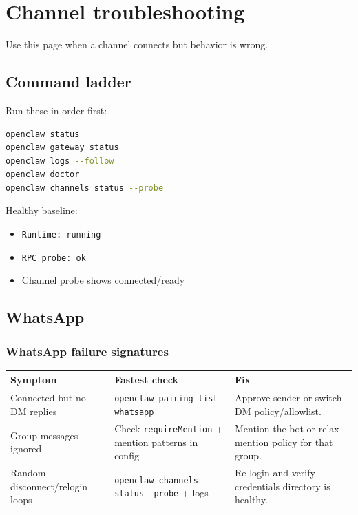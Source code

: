 \clearpage

\section{Channel troubleshooting}


Use this page when a channel connects but behavior is wrong.

\subsection{Command ladder}


Run these in order first:

\begin{lstlisting}[language=bash]
openclaw status
openclaw gateway status
openclaw logs --follow
openclaw doctor
openclaw channels status --probe
\end{lstlisting}


Healthy baseline:

\begin{itemize}
  \item \texttt{Runtime: running}
  \item \texttt{RPC probe: ok}
  \item Channel probe shows connected/ready
\end{itemize}


\subsection{WhatsApp}


\subsubsection{WhatsApp failure signatures}



\begin{table}[h]
\centering
\small
\begin{tabular}{|l|l|l|}
\hline
Symptom & Fastest check & Fix \\
\hline
Connected but no DM replies & \texttt{openclaw pairing list whatsapp} & Approve sender or switch DM policy/allowlist. \\
\hline
Group messages ignored & Check \texttt{requireMention} + mention patterns in config & Mention the bot or relax mention policy for that group. \\
\hline
Random disconnect/relogin loops & \texttt{openclaw channels status --probe} + logs & Re-login and verify credentials directory is healthy. \\
\hline
\end{tabular}
\end{table}



